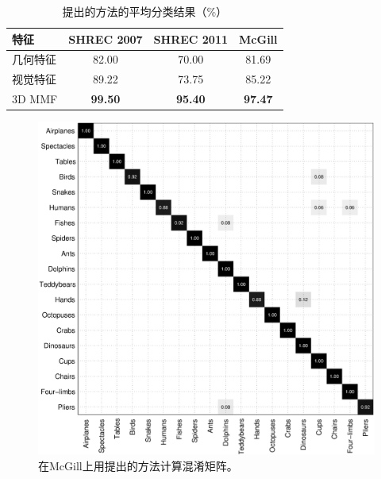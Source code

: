 \begin{table}[hptb]
\caption{提出的方法的平均分类结果（\%）}\label{table_classification_results_3}
\centering
\begin{tabular}{lccc}  %
\hline \hline
特征                 &SHREC 2007     &SHREC 2011         & McGill \\ 
\hline
几何特征   &82.00          &70.00              & 81.69    \\ 
视觉特征       &89.22          &73.75              & 85.22\\  

3D MMF                  &\textbf{99.50} &\textbf{95.40}     &\textbf{97.47}\\  
\hline  \hline       
\end{tabular}

\end{table}

\begin{figure}[hptb]
\begin{center}
\includegraphics[width=0.98\linewidth]{figures/CMmcgill}
\end{center} 
\vspace{-4mm}
\caption{在McGill上用提出的方法计算混淆矩阵。} \label{fig_cm_mcgill}
\end{figure}


